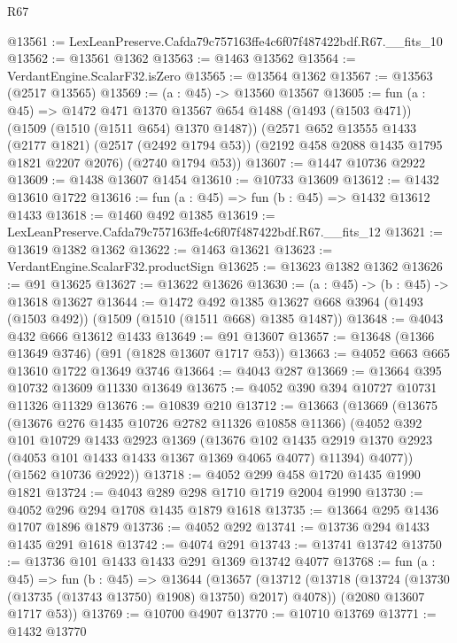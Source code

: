 \begin{lexlean}{R67}
\begin{coremodule}
@13561 := LexLeanPreserve.Cafda79c757163ffe4c6f07f487422bdf.R67.__fits_10
@13562 := @13561 @1362
@13563 := @1463 @13562
@13564 := VerdantEngine.ScalarF32.isZero
@13565 := @13564 @1362
@13567 := @13563 (@2517 @13565)
@13569 := (a : @45) -> @13560 @13567
@13605 := fun (a : @45) =>
  @1472
    @471
    @1370
    @13567
    @654
    @1488
    (@1493 (@1503 @471))
    (@1509 (@1510 (@1511 @654) @1370 @1487))
    (@2571
      @652
      @13555
      @1433
      (@2177 @1821)
      (@2517 (@2492 @1794 @53))
      (@2192 @458 @2088 @1435 @1795 @1821 @2207 @2076)
      (@2740 @1794 @53))
@13607 := @1447 @10736 @2922
@13609 := @1438 @13607 @1454
@13610 := @10733 @13609
@13612 := @1432 @13610 @1722
@13616 := fun (a : @45) => fun (b : @45) => @1432 @13612 @1433
@13618 := @1460 @492 @1385
@13619 := LexLeanPreserve.Cafda79c757163ffe4c6f07f487422bdf.R67.__fits_12
@13621 := @13619 @1382 @1362
@13622 := @1463 @13621
@13623 := VerdantEngine.ScalarF32.productSign
@13625 := @13623 @1382 @1362
@13626 := @91 @13625
@13627 := @13622 @13626
@13630 := (a : @45) -> (b : @45) -> @13618 @13627
@13644 := @1472
    @492
    @1385
    @13627
    @668
    @3964
    (@1493 (@1503 @492))
    (@1509 (@1510 (@1511 @668) @1385 @1487))
@13648 := @4043 @432 @666 @13612 @1433
@13649 := @91 @13607
@13657 := @13648 (@1366 @13649 @3746) (@91 (@1828 @13607 @1717 @53))
@13663 := @4052 @663 @665 @13610 @1722 @13649 @3746
@13664 := @4043 @287
@13669 := @13664 @395 @10732 @13609 @11330 @13649
@13675 := @4052 @390 @394 @10727 @10731 @11326 @11329
@13676 := @10839 @210
@13712 := @13663
    (@13669
      (@13675
        (@13676 @276 @1435 @10726 @2782 @11326 @10858 @11366)
        (@4052
          @392
          @101
          @10729
          @1433
          @2923
          @1369
          (@13676
            @102
            @1435
            @2919
            @1370
            @2923
            (@4053 @101 @1433 @1433 @1367 @1369 @4065 @4077)
            @11394)
          @4077))
      (@1562 @10736 @2922))
@13718 := @4052 @299 @458 @1720 @1435 @1990 @1821
@13724 := @4043 @289 @298 @1710 @1719 @2004 @1990
@13730 := @4052 @296 @294 @1708 @1435 @1879 @1618
@13735 := @13664 @295 @1436 @1707 @1896 @1879
@13736 := @4052 @292
@13741 := @13736 @294 @1433 @1435 @291 @1618
@13742 := @4074 @291
@13743 := @13741 @13742
@13750 := @13736 @101 @1433 @1433 @291 @1369 @13742 @4077
@13768 := fun (a : @45) =>
  fun (b : @45) =>
  @13644
    (@13657
      (@13712 (@13718 (@13724 (@13730 (@13735 (@13743 @13750) @1908) @13750) @2017) @4078))
      (@2080 @13607 @1717 @53))
@13769 := @10700 @4907
@13770 := @10710 @13769
@13771 := @1432 @13770

\end{coremodule}
\end{lexlean}
